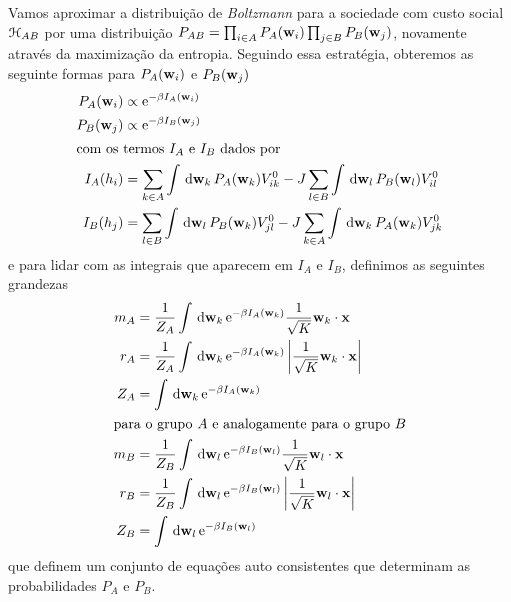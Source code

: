 Vamos aproximar a distribuição de \emph{Boltzmann} para a sociedade com custo social ${\mathcal{H}}_{AB}$ por uma distribuição $P_{AB}=\prod_{i\in A}P_A(\mathbf{w}_{i})\prod_{j\in B}P_B(\mathbf{w}_{j})$, novamente através da maximização da entropia.
Seguindo essa estratégia, obteremos as seguinte formas para $P_A(\mathbf{w}_{i})$ e $P_B(\mathbf{w}_{j})$
\begin{align}
  P_A(\agt{i}) & \propto \EulerE^ {-\beta I_A(\agt{i})} \label{eq:PA}\\
  P_B(\agt{j}) & \propto \EulerE^ {-\beta I_B(\agt{j})} \label{eq:PB} \\
\intertext{com os termos $I_A$ e $I_B$ dados por}
  I_A(h_i) & = \sum_{k\in A}\int \msr{\agt{k}} P_A(\agt{k}) V^0_{ik}
  - J \sum_{l\in B} \int \msr{\agt{l}} P_B(\agt{l}) V^0_{il}
  \label{eq:IA} \\
  I_B(h_j) & = \sum_{l\in B}\int \msr{\agt{l}} P_B(\agt{k}) V^0_{jl}
  - J \sum_{k\in A} \int \msr{\agt{k}} P_A(\agt{k}) V^0_{jk}
  \label{eq:IB}
\end{align}
e para lidar com as integrais que aparecem em $I_A$ e $I_B$, definimos as seguintes grandezas
\begin{align}
  m_A & = {1\over Z_A}\int\,\mathrm{d} \mathbf{w}_{k}\,\mathrm{e}^{-\beta I_A(\mathbf{w}_{k})} {1\over \sqrt{K}} \mathbf{w}_{k} \cdot \mathbf{\mathbf{x}} \\
  r_A & = {1\over Z_A}\int\,\mathrm{d} \mathbf{w}_{k}\,\mathrm{e}^{-\beta I_A(\mathbf{w}_{k})}\left| {1\over \sqrt{K}} \mathbf{w}_{k} \cdot \mathbf{\mathbf{x}}\right| \\
  Z_A & = \int\,\mathrm{d} \mathbf{w}_{k}\,\mathrm{e}^{-\beta I_A(\mathbf{w}_{k})} \\
\intertext{para o grupo $A$ e analogamente para o grupo $B$}
  m_B & = {1\over Z_B}\int\,\mathrm{d} \mathbf{w}_{l}\,\mathrm{e}^{-\beta I_B(\mathbf{w}_{l})} {1\over \sqrt{K}} \mathbf{w}_{l} \cdot \mathbf{\mathbf{x}} \\
  r_B & = {1\over Z_B}\int\,\mathrm{d} \mathbf{w}_{l}\,\mathrm{e}^{-\beta I_B(\mathbf{w}_{l})}\left| {1\over \sqrt{K}} \mathbf{w}_{l} \cdot \mathbf{\mathbf{x}}\right| \\
  Z_B & = \int\,\mathrm{d} \mathbf{w}_{l}\,\mathrm{e}^{-\beta I_B(\mathbf{w}_{l})}
\end{align}
que definem um conjunto de equações auto consistentes que  determinam as probabilidades $P_A$ e $P_B$.

